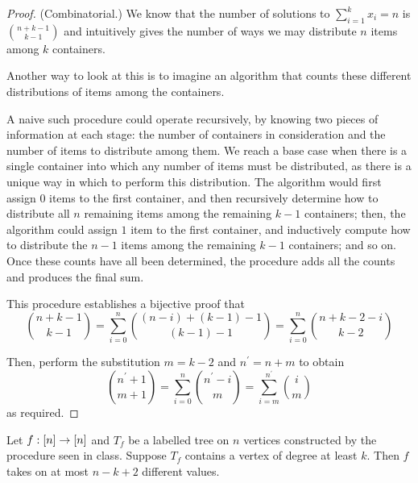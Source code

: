 \documentclass[11pt]{article}
\begin{document}
\begin{proof}{(Combinatorial.)}
    We know that the number of solutions to $\sum_{i=1}^k x_i = n$ is
    $\binom{n+k-1}{k-1}$ and intuitively gives the number of ways we may
    distribute $n$ items among $k$ containers.

    Another way to look at this is to imagine an algorithm that counts these
    different distributions of items among the containers.

    A naive such procedure could operate recursively, by knowing two pieces of
    information at each stage: the number of containers in consideration and
    the number of items to distribute among them.
    We reach a base case when there is a single container into which any number
    of items must be distributed, as there is a unique way in which to perform
    this distribution.
    The algorithm would first assign $0$ items to the first container,
    and then recursively determine how to distribute all $n$ remaining items
    among the remaining $k-1$ containers;
    then, the algorithm could assign $1$ item to the first container, and
    inductively compute how to distribute the $n-1$ items among the remaining
    $k-1$ containers; and so on.
    Once these counts have all been determined, the procedure adds all the
    counts and produces the final sum.

    This procedure establishes a bijective proof that
    \begin{equation*}
        \binom{n + k - 1}{k - 1}
        = \sum_{i=0}^n \binom{(n - i) + (k - 1) - 1}{(k - 1) - 1}
        = \sum_{i=0}^n \binom{n + k - 2 - i}{k - 2}
    \end{equation*}

    Then, perform the substitution $m = k - 2$ and $n^\prime = n + m$ to
    obtain
    \begin{equation*}
        \binom{n^\prime + 1}{m + 1}
        =
        \sum_{i=0}^n \binom{n^\prime - i}{m}
        =
        \sum_{i=m}^{n^\prime} \binom{i}{m}
    \end{equation*}
    as required.
\end{proof}


\begin{prop}
    Let $f : \left[n\right] \to \left[n\right]$ and $T_f$ be a labelled tree on $n$ vertices
    constructed by the procedure seen in class.
    Suppose $T_f$ contains a vertex of degree at least $k$.
    Then $f$ takes on at most $n - k + 2$ different values.
\end{prop}
\end{document}
